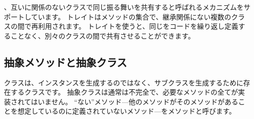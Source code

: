\documentclass[a4paper,10pt,twoside]{book}
\begin{document}
\dothis{新しいクラスを生成するには、既存のクラスに
\ct{subclass: instanceVariableNames: ...}
というメッセージを送ります。
他にもいくつかクラスを生成するメソッドがあります。
\prot{Kernel-Classes \go Class \go subclass creation}プロトコルを見て、どのようなメソッドがあるか見てみてください。}


、互いに関係のないクラスで同じ振る舞いを共有すると呼ばれるメカニズムをサポートしています。
トレイトはメソッドの集合で、継承関係にない複数のクラスの間で再利用されます。
トレイトを使うと、同じをコードを繰り返し定義することなく、別々のクラスの間で共有させることができます。

\subsection{抽象メソッドと抽象クラス}

クラスは、インスタンスを生成するのではなく、サブクラスを生成するために存在するクラスです。
抽象クラスは通常は不完全で、必要なメソッドの全てが実装されてはいません。
``ない''メソッド---他のメソッドがそのメソッドがあることを想定しているのに定義されていないメソッド---をメソッドと呼びます。
\end{document}
